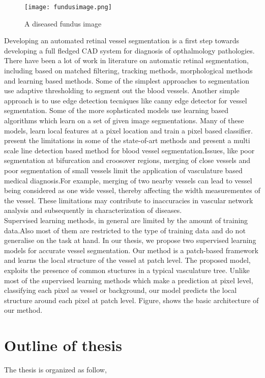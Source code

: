 \begin{figure}
		\centering	
		\texttt{[image: fundusimage.png]}
		\caption{A diseased fundus image}
		\label{fig:fundusdiseased}		
\end{figure}	

Developing an automated retinal vessel segmentation is a first step towards developing a full fledged CAD system for diagnosis of opthalmology pathologies. There have been a lot of work in literature on automatic retinal segmentation, including based on matched filtering, tracking methods, morphological methods and learning based methods. Some of the simplest approaches to segmentation use adaptive thresholding to segment out the blood vessels. Another simple approach is to use edge detection tecniques like canny edge detector for vessel segmentation. Some of the more sophsticated models use learning based algorithms which learn on a set of given image segmentations. Many of these models, learn local features at a pixel location and train a pixel based classifier.\citep{nguyen2011effective} present the limitations in some of the state-of-art methods and present a multi scale line detection based method for blood vessel segmentation.Issues, like poor segmentation at bifurcation and croosover regions, merging of close vessels and poor segmentation of small vessels limit the application of vasculature based medical diagnosis.For example, merging of two nearby vessels can lead to vessel being considered as one wide vessel, thereby affecting the width measurementes of the vessel. These limitations may contribute to inaccuracies in vascular network analysis and subsequently in characterization of diseases. \\

Supervised learning methods, in general are limited by the amount of training data.Also most of them are restricted to the type of training data and do not generalise on the task at hand. In our thesis, we propose two supervised learning models for accurate vessel segmentation. Our method is a patch-based framework and learns the local structure of the vessel at patch level. The proposed model, exploits the presence of common stuctures in a typical vasculature tree. Unlike most of the supervised learning methods which make a prediction at pixel level, classifying each pixel as vessel or background, our model predicts the local structure around each pixel at patch level. Figure, shows the basic architecture of our method.

\section{Outline of thesis}
The thesis is organized as follow,
